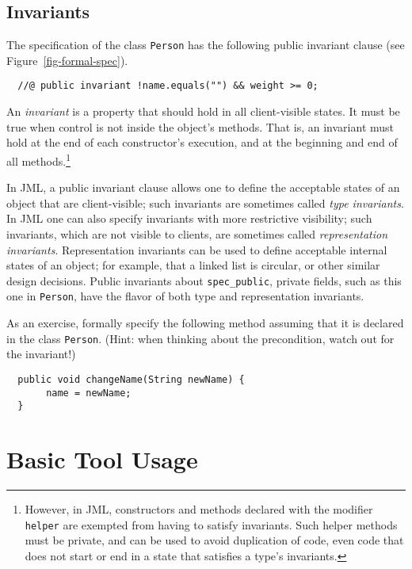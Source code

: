 \documentclass{jotarticle}
\begin{document}

\subsection{Invariants}
\label{sect-invariants}

The specification of the class \texttt{Person} has the following
public invariant clause (see Figure~\ref{fig-formal-spec}).

\begin{verbatim}
  //@ public invariant !name.equals("") && weight >= 0;
\end{verbatim}

An \emph{invariant\/} is a property that should hold in all
client-visible states.
It must be true when control is not inside the object's
methods.  
That is, an invariant must hold at the end of each constructor's
execution, and at the beginning and end of all methods.\footnote{
  However, in JML, constructors and methods declared with the modifier
  \texttt{helper} are exempted from having to satisfy invariants.
  Such helper methods must be private, and can be used to avoid duplication
  of code, even code that does not start or end in a state that
  satisfies a type's invariants.}

In JML, a public invariant clause allows one to define the acceptable
states of an object that are client-visible;
such invariants are sometimes called \emph{type invariants}.
In JML one can also specify invariants with more restrictive
visibility;
such invariants, which are not visible to clients,
are sometimes called \emph{representation invariants}.
Representation invariants can be used to define acceptable internal
states of an object; for example, that a linked list is circular, or
other similar design decisions.
Public invariants about \texttt{spec\_public}, private fields, such as
this one in \texttt{Person}, have the flavor of both type and
representation invariants. 

As an exercise, formally specify the following method assuming that it
is declared in the class \texttt{Person}.
(Hint: when thinking about the precondition, watch out for the invariant!)

\begin{verbatim}
  public void changeName(String newName) {
       name = newName;
  }
\end{verbatim}

\section{Basic Tool Usage}
\label{sect-tools}
\end{document}
